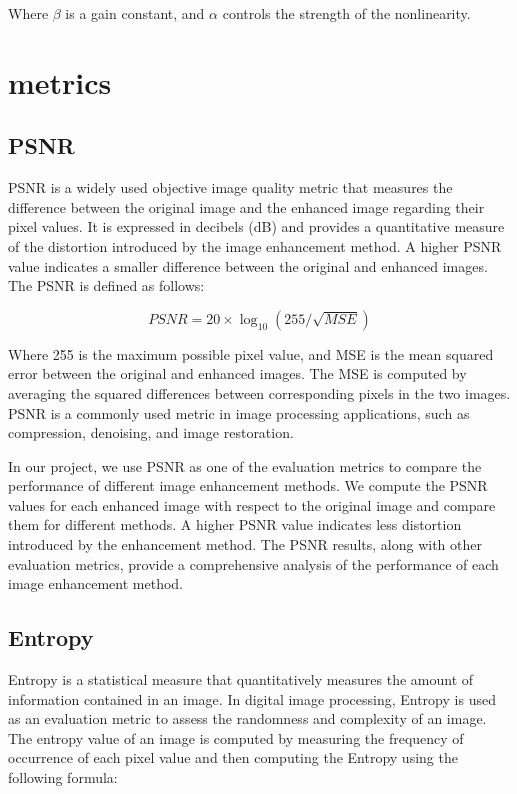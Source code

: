 \documentclass[conference]{IEEEtran}
\begin{document}
Where $\beta$ is a gain constant, and $\alpha$ controls the strength of the nonlinearity.

\section{metrics}

\subsection{PSNR}
PSNR is a widely used objective image quality metric that measures the difference between the original image and the enhanced image regarding their pixel values. It is expressed in decibels (dB) and provides a quantitative measure of the distortion introduced by the image enhancement method. A higher PSNR value indicates a smaller difference between the original and enhanced images. The PSNR is defined as follows:

\begin{equation}
PSNR = 20\times\log_{10} (255 / \sqrt{MSE})   \label{eq1}
\end{equation}

Where 255 is the maximum possible pixel value, and MSE is the mean squared error between the original and enhanced images. The MSE is computed by averaging the squared differences between corresponding pixels in the two images. PSNR is a commonly used metric in image processing applications, such as compression, denoising, and image restoration.

In our project, we use PSNR as one of the evaluation metrics to compare the performance of different image enhancement methods. We compute the PSNR values for each enhanced image with respect to the original image and compare them for different methods. A higher PSNR value indicates less distortion introduced by the enhancement method. The PSNR results, along with other evaluation metrics, provide a comprehensive analysis of the performance of each image enhancement method.

\subsection{Entropy}
Entropy is a statistical measure that quantitatively measures the amount of information contained in an image. In digital image processing, Entropy is used as an evaluation metric to assess the randomness and complexity of an image. The entropy value of an image is computed by measuring the frequency of occurrence of each pixel value and then computing the Entropy using the following formula:
\end{document}
